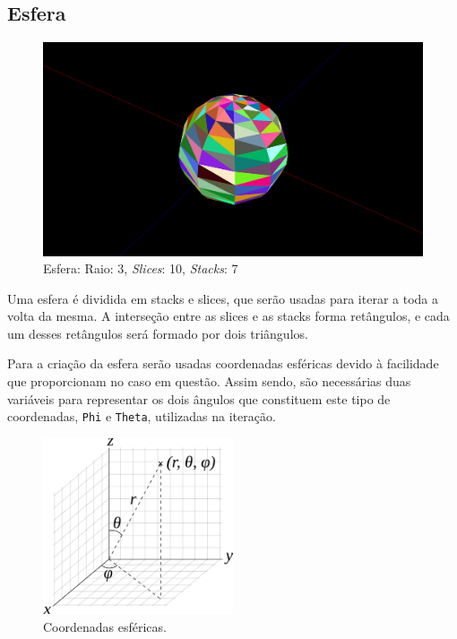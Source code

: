 \documentclass[a4paper]{article}
\begin{document}
\subsection{Esfera}

\begin{figure}[H]
    \centering
    \includegraphics[width=\textwidth]{sphere.png}
    \caption{Esfera: Raio: 3, \textit{Slices}: 10, \textit{Stacks}: 7}
\end{figure}

Uma esfera é dividida em stacks e slices, que serão usadas para iterar a toda a volta da mesma. A interseção entre as slices e as stacks forma retângulos, e cada um desses retângulos será formado por dois triângulos.


Para a criação da esfera serão usadas coordenadas esféricas devido à facilidade que proporcionam no caso em questão. Assim sendo, são necessárias duas variáveis para representar os dois ângulos que constituem este tipo de coordenadas, \texttt{Phi} e \texttt{Theta}, utilizadas na iteração.

\begin{figure}[H]
    \centering
    \includegraphics[width=0.5\textwidth]{coords.png}
    \caption{Coordenadas esféricas.}
\end{figure}
\end{document}
